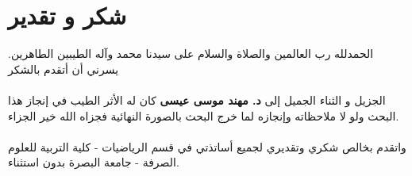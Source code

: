 \chapter*{شكر و تقدير}

الحمدلله رب العالمين والصلاة والسلام على سيدنا محمد وآله الطيبين الطاهرين. يسرني أن أتقدم بالشكر\\ \\ الجزيل و الثناء الجميل إلى \textbf{د. مهند موسى عيسى} كان له الأثر الطيب في إنجاز هذا البحث ولو لا ملاحظاته وإنجازه لما خرج البحث بالصورة النهائية فجزاه الله خير الجزاء.\\
\\
واتقدم بخالص شكري وتقديري لجميع أساتذتي في قسم الرياضيات - كلية التربية للعلوم الصرفة - جامعة البصرة بدون استثناء.

